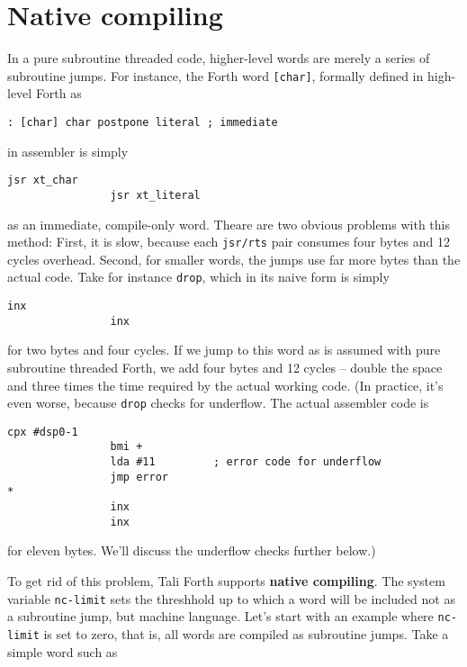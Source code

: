 \section{Native compiling}

In a pure subroutine threaded code, higher-level words are merely a series of
subroutine jumps. For instance, the Forth word
\texttt{[char]}, formally defined in high-level
Forth as

\begin{lstlisting}[frame=lines]
        : [char] char postpone literal ; immediate
\end{lstlisting}

\noindent in assembler is simply

\begin{lstlisting}[frame=lines]
                jsr xt_char
                jsr xt_literal
\end{lstlisting}

\noindent as an immediate, compile-only word. Theare are two obvious problems
with this method: First, it is slow, because each \texttt{jsr/rts} pair consumes
four bytes and 12 cycles overhead. Second, for smaller words, the jumps use far
more bytes than the actual code. Take for instance
\texttt{drop}, which in its naive form is simply

\begin{lstlisting}[frame=lines]
                inx
                inx
\end{lstlisting}

\noindent for two bytes and four cycles. If we jump to this word as is assumed
with pure subroutine threaded Forth, we add four bytes and 12 cycles -- double
the space and three times the time required by the actual working code. (In
practice, it's even worse, because \texttt{drop} checks for
underflow. The actual assembler code is

\begin{lstlisting}[frame=lines]
                cpx #dsp0-1
                bmi +
                lda #11         ; error code for underflow
                jmp error
*
                inx
                inx
\end{lstlisting}

\noindent for eleven bytes. We'll discuss the underflow checks further below.)

To get rid of this problem, Tali Forth supports \textbf{native
compiling}. The system variable
\texttt{nc-limit} sets
the threshhold up to which a word will be included not as a subroutine jump, but
machine language. Let's start with an example where \texttt{nc-limit} is set to
zero, that is, all words are compiled as subroutine jumps. Take a simple word
such as

